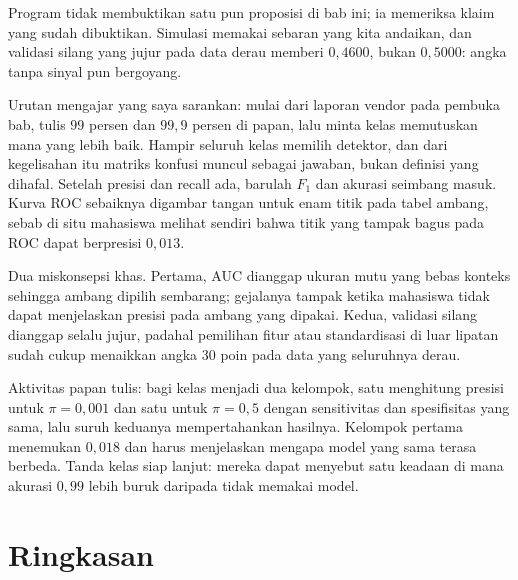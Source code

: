 Program tidak membuktikan satu pun proposisi di bab ini; ia memeriksa klaim yang sudah
dibuktikan. Simulasi memakai sebaran yang kita andaikan, dan validasi silang yang jujur
pada data derau memberi $0{,}4600$, bukan $0{,}5000$: angka tanpa sinyal pun bergoyang.

\begin{untukdosen}
Urutan mengajar yang saya sarankan: mulai dari laporan vendor pada pembuka bab, tulis
$99$ persen dan $99{,}9$ persen di papan, lalu minta kelas memutuskan mana yang lebih
baik. Hampir seluruh kelas memilih detektor, dan dari kegelisahan itu matriks konfusi
muncul sebagai jawaban, bukan definisi yang dihafal. Setelah presisi dan recall ada,
barulah $F_1$ dan akurasi seimbang masuk. Kurva ROC sebaiknya digambar tangan untuk enam
titik pada tabel ambang, sebab di situ mahasiswa melihat sendiri bahwa titik yang tampak
bagus pada ROC dapat berpresisi $0{,}013$.

Dua miskonsepsi khas. Pertama, AUC dianggap ukuran mutu yang bebas konteks sehingga ambang
dipilih sembarang; gejalanya tampak ketika mahasiswa tidak dapat menjelaskan presisi pada
ambang yang dipakai. Kedua, validasi silang dianggap selalu jujur, padahal pemilihan fitur
atau standardisasi di luar lipatan sudah cukup menaikkan angka $30$ poin pada data yang
seluruhnya derau.

Aktivitas papan tulis: bagi kelas menjadi dua kelompok, satu menghitung presisi untuk
$\pi=0{,}001$ dan satu untuk $\pi=0{,}5$ dengan sensitivitas dan spesifisitas yang sama,
lalu suruh keduanya mempertahankan hasilnya. Kelompok pertama menemukan $0{,}018$ dan harus
menjelaskan mengapa model yang sama terasa berbeda. Tanda kelas siap lanjut: mereka dapat
menyebut satu keadaan di mana akurasi $0{,}99$ lebih buruk daripada tidak memakai model.
\end{untukdosen}

\section{Ringkasan}

